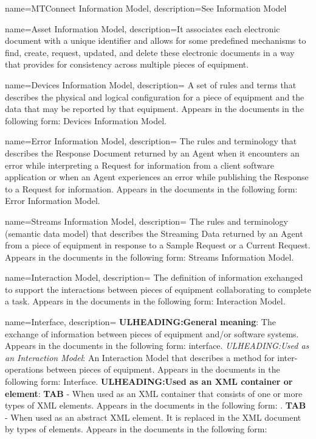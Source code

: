 {
    name={MTConnect Information Model},
	description={See \gls{Information Model}}
}

{
    name={Asset Information Model},
	description={It associates each electronic  document with a unique identifier and allows for some predefined mechanisms to find, create, request, updated, and delete these electronic documents in a way that provides for consistency across multiple pieces of equipment.}
}

{
    name={Devices Information Model},
	description={
	A set of rules and terms that describes the physical and logical configuration for a piece of equipment and the data that may be reported by that equipment.    
	Appears in the documents in the following form: \gls{Devices Information Model}.
}
}

{
    name={Error Information Model},
	description={
	The rules and terminology that describes the \gls{Response Document} returned by an \gls{Agent} when it encounters an error while interpreting a \gls{Request} for information from a client software application or when an \gls{Agent} experiences an error while publishing the \gls{Response} to a \gls{Request} for information.
	Appears in the documents in the following form: \gls{Error Information Model}.
}
}

{
    name={Streams Information Model},
	description={
	The rules and terminology (\gls{semantic data model}) that describes the \gls{Streaming Data} returned by an \gls{Agent} from a piece of equipment in response to a \gls{Sample Request} or a \gls{Current Request}.
	Appears in the documents in the following form: \gls{Streams Information Model}.
}
}

{
    name={Interaction Model},
	description={
	The definition of information exchanged to support the interactions between pieces of equipment collaborating to complete a task.
	Appears in the documents in the following form: \gls{Interaction Model}.
}
}

{
    name={Interface},
	description={
	\textbf{ULHEADING:General meaning}:
	The exchange of information between pieces of equipment and/or software systems.
	Appears in the documents in the following form: interface.
	\textit{ULHEADING:Used as an \gls{Interaction Model}}:
	An \gls{Interaction Model} that describes a method for inter-operations between pieces of equipment.
	Appears in the documents in the following form: \gls{Interface}.
	\textbf{ULHEADING:Used as an XML container or element}:
	\textbf{TAB} - When used as an XML container that consists of one or more types of  XML elements.
	Appears in the documents in the following form: .
	\textbf{TAB} - When used as an abstract XML element.  It is replaced in the XML document by types of  elements.
	Appears in the documents in the following form: 
}
}

